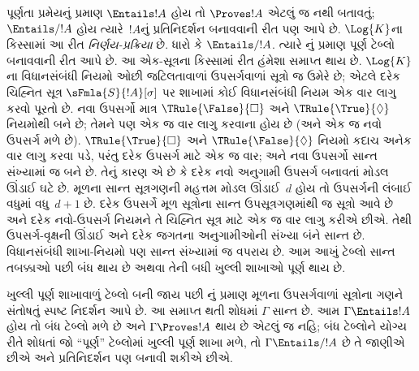 \begin{explain}
  પૂર્ણતા પ્રમેયનું પ્રમાણ $\Entails !A$ હોય તો $\Proves !A$
  એટલું જ નથી બતાવતું; $\Entails/ !A$ હોય ત્યારે~$!A$નું
  પ્રતિનિદર્શન બનાવવાની રીત પણ આપે છે.
  $\Log{K}$ના કિસ્સામાં આ રીત \emph{નિર્ણય-પ્રક્રિયા} છે.
  ધારો કે $\Entails/ !A$. ત્યારે
  નું પ્રમાણ પૂર્ણ
  ટેબ્લો બનાવવાની રીત આપે છે. આ એક-સૂત્રના કિસ્સામાં
  રીત હંમેશા સમાપ્ત થાય છે. $\Log{K}$ના વિધાનસંબંધી નિયમો
  ઓછી જટિલતાવાળાં ઉપસર્ગવાળાં સૂત્રો જ ઉમેરે છે;
  એટલે દરેક ચિહ્નિત સૂત્ર $\sFmla{S}{!A}[\sigma]$ પર
  શાખામાં કોઈ વિધાનસંબંધી નિયમ એક વાર લાગુ કરવો પૂરતો છે.
  નવા ઉપસર્ગો માત્ર
  $\TRule{\False}{\Box}$
    અને $\TRule{\True}{\Diamond}$
  નિયમોથી બને છે; તેમને
  પણ એક જ વાર લાગુ કરવાના હોય છે (અને એક જ નવો ઉપસર્ગ મળે છે).
  $\TRule{\True}{\Box}$
    અને $\TRule{\False}{\Diamond}$
  નિયમો કદાચ અનેક વાર
  લાગુ કરવા પડે, પરંતુ દરેક ઉપસર્ગ માટે એક જ વાર; અને નવા
  ઉપસર્ગો સાન્ત સંખ્યામાં જ બને છે. તેનું કારણ એ છે કે
  દરેક નવો અનુગામી ઉપસર્ગ બનાવતાં મોડલ ઊંડાઈ ઘટે છે.
  મૂળના સાન્ત સૂત્રગણની મહત્તમ મોડલ ઊંડાઈ~$d$ હોય તો
  ઉપસર્ગની લંબાઈ વધુમાં વધુ~$d+1$ છે. દરેક ઉપસર્ગે મૂળ
  સૂત્રોના સાન્ત ઉપસૂત્રગણમાંથી જ સૂત્રો આવે છે અને દરેક
  નવો-ઉપસર્ગ નિયમને તે ચિહ્નિત સૂત્ર માટે એક જ વાર લાગુ કરીએ
  છીએ. તેથી ઉપસર્ગ-વૃક્ષની ઊંડાઈ અને દરેક જગતના અનુગામીઓની
  સંખ્યા બંને સાન્ત છે. વિધાનસંબંધી શાખા-નિયમો પણ સાન્ત
  સંખ્યામાં જ વપરાય છે. આમ આખું ટેબ્લો સાન્ત તબક્કાઓ પછી
  બંધ થાય છે અથવા તેની બધી ખુલ્લી શાખાઓ પૂર્ણ થાય છે.

  ખુલ્લી પૂર્ણ શાખાવાળું ટેબ્લો બની જાય પછી
  નું પ્રમાણ મૂળના
  ઉપસર્ગવાળાં સૂત્રોના ગણને સંતોષતું સ્પષ્ટ નિદર્શન
  આપે છે. આ સમાપ્ત થતી શોધમાં $\Gamma$ સાન્ત છે.
  આમ $\Gamma \Entails !A$ હોય તો બંધ ટેબ્લો
  મળે છે અને $\Gamma \Proves !A$ થાય છે એટલું જ નહિ;
  બંધ ટેબ્લોને યોગ્ય રીતે શોધતાં જો ``પૂર્ણ''
  ટેબ્લોમાં ખુલ્લી પૂર્ણ શાખા મળે, તો $\Gamma \Entails/ !A$ છે તે જાણીએ
  છીએ અને પ્રતિનિદર્શન પણ બનાવી શકીએ છીએ.
\end{explain}


